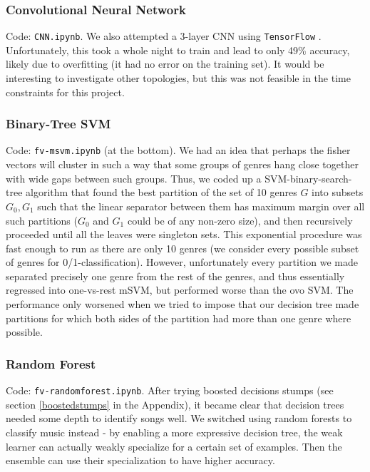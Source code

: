 \documentclass{article}
\begin{document}
\subsubsection{Convolutional Neural Network}\label{cnn}

Code: \texttt{CNN.ipynb}. We also attempted a 3-layer CNN using \texttt{TensorFlow} \cite{tensorflow2015-whitepaper}. Unfortunately, this took a whole night to train and lead to only 49\% accuracy, likely due to overfitting (it had no error on the training set). It would be interesting to investigate other topologies, but this was not feasible in the time constraints for this project.

\subsubsection{Binary-Tree SVM}

Code: \texttt{fv-msvm.ipynb} (at the bottom).
We had an idea that perhaps the fisher vectors will cluster in such
a way that some groups of genres hang close together with wide
gaps between such groups.
Thus, we coded up a SVM-binary-search-tree algorithm that
found the best partition of the set of 10 genres $G$ into 
subsets $G_0, G_1$ such that the linear separator between them
has maximum margin over all such partitions ($G_0$ and $G_1$ could be
of any non-zero size), and then recursively proceeded until
all the leaves were singleton sets.
This exponential procedure was fast enough to run as there are only
10 genres (we consider every possible subset of genres for 0/1-classification).
However, unfortunately every partition we made separated precisely
one genre from the rest of the genres,
and thus essentially regressed into one-vs-rest mSVM, but performed worse than the ovo SVM.
The performance only worsened when we tried to impose
that our decision tree made partitions for which both sides of the 
partition had more than one genre where possible.


\subsubsection{Random Forest}\label{rf}

Code: \texttt{fv-randomforest.ipynb}. After trying boosted decisions stumps (see section \ref{boostedstumps} in the Appendix), it became clear that decision trees needed some depth to identify songs well. We switched using random forests to classify music instead - by enabling a more expressive decision tree, the weak learner can actually weakly specialize for a certain set of examples. Then the ensemble can use their specialization to have higher accuracy.
\end{document}

